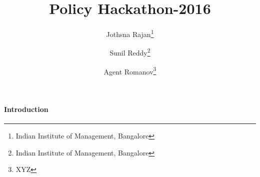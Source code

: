 \documentclass[12pt, a4paper]{article}
\title{Policy Hackathon-2016}
\author{Jothsna Rajan\thanks{Indian Institute of Management, Bangalore} \and Sunil Reddy\thanks{Indian Institute of Management, Bangalore} \and Agent Romanov\thanks{XYZ}}
\begin{document}
\maketitle
\paragraph{Introduction}
\end{document}
